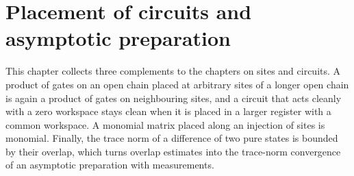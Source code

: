\chapter{Placement of circuits and asymptotic preparation}
\label{ch:circuitplacement}

This chapter collects three complements to the chapters on sites and circuits.
A product of gates on an open chain placed at arbitrary sites of a longer open
chain is again a product of gates on neighbouring sites, and a circuit that acts
cleanly with a zero workspace stays clean when it is placed in a larger
register with a common workspace. A monomial matrix placed along an injection of
sites is monomial. Finally, the trace norm of a difference of two pure states is
bounded by their overlap, which turns overlap estimates into the trace-norm
convergence of an asymptotic preparation with measurements.




